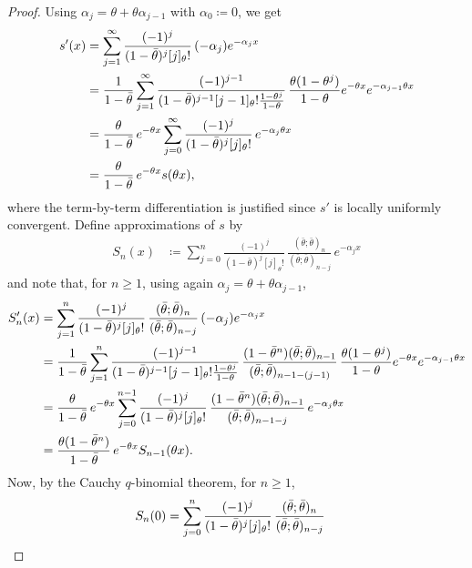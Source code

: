 \documentclass[10pt,a4paper]{amsart}
\newcommand{\1}{\mathds{1}}
\begin{document}
\begin{proof}
Using $\alpha_j = \theta + \theta \alpha_{j-1}$ with $\alpha_0\coloneqq 0$, we get
\begin{align}\label{eqn:dgl}
s'(x)
 & = \sum_{j=1}^\infty \frac{(-1)^j}{ (1-\bar \theta)^j [j]_\theta!}\, (-\alpha_j) e^{-\alpha_j x}\notag
\\
 & = \frac{1}{1-\bar \theta}\sum_{j=1}^\infty \frac{(-1)^{j-1}}{ (1-\bar \theta)^{j-1} [j-1]_\theta! \frac{1-\theta^j}{1-\theta}}\, \frac{\theta (1-\theta^j)}{1-\theta} e^{-\theta x} e^{-\alpha_{j-1} \theta x}\notag
\\
 & = \frac{\theta}{1-\bar \theta}\,e^{-\theta x}\sum_{j=0}^{\infty} \frac{(-1)^{j}}{ (1-\bar \theta)^{j} [j]_\theta! }\,  e^{-\alpha_{j} \theta x}\notag
\\
&= \frac{\theta}{1-\bar \theta}\,e^{-\theta x} s(\theta x),
\end{align}
where the term-by-term differentiation is justified since $s'$ is locally uniformly convergent. Define approximations of $s$ by
\begin{align*}
S_n(x) & \coloneqq  \sum_{j=0}^n \frac{(-1)^j}{ (1-\bar \theta)^j [j]_\theta!}\,\frac{(\bar\theta;\bar\theta)_n}{(\bar\theta;\bar\theta)_{n-j}}\, e^{-\alpha_j x}
\end{align*}
and note that, for $n\ge 1$, using again $\alpha_j = \theta + \theta \alpha_{j-1}$,
\begin{align}
S_n'(x)
 & = \sum_{j=1}^n \frac{(-1)^j}{ (1-\bar \theta)^j [j]_\theta!}\, \frac{(\bar\theta;\bar\theta)_n}{(\bar\theta;\bar\theta)_{n-j}}\,(-\alpha_j) e^{-\alpha_j x} \notag
\\
 & = \frac{1}{1-\bar \theta}\sum_{j=1}^n \frac{(-1)^{j-1}}{ (1-\bar \theta)^{j-1} [j-1]_\theta! \frac{1-\theta^j}{1-\theta}}\, \frac{(1-\bar\theta^n)(\bar\theta;\bar\theta)_{n-1}}{(\bar\theta;\bar\theta)_{n-1-(j-1)}}\,\frac{\theta (1-\theta^j)}{1-\theta} e^{-\theta x} e^{-\alpha_{j-1} \theta x} \notag
\\
 & = \frac{\theta}{1-\bar \theta}\,e^{-\theta x}\sum_{j=0}^{n-1} \frac{(-1)^{j}}{ (1-\bar \theta)^{j} [j]_\theta! }\,  \frac{(1-\bar\theta^{n})(\bar\theta;\bar\theta)_{n-1}}{(\bar\theta;\bar\theta)_{n-1-j}}\, e^{-\alpha_{j} \theta x} \notag
\\
&= \frac{\theta(1-\bar\theta^{n})}{1-\bar \theta}\,e^{-\theta x} S_{n-1}(\theta x). \label{eqn:recursiondgl}
\end{align}
Now, by the Cauchy $q$-binomial theorem, for $n\ge 1$,
\begin{align}
S_n(0) & = \sum_{j=0}^n \frac{(-1)^j}{ (1-\bar \theta)^j [j]_\theta!}\,\frac{(\bar\theta;\bar\theta)_n}{(\bar\theta;\bar\theta)_{n-j}} \notag

\end{align}
\end{proof}
\end{document}
